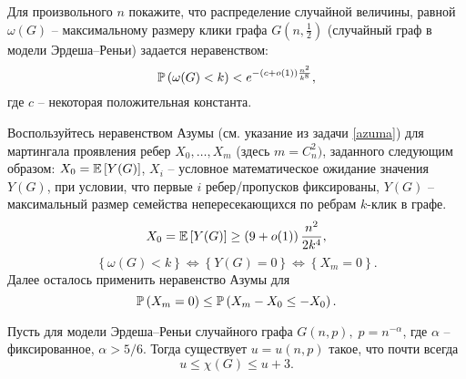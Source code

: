 \begin{problem}

Для произвольного $n$ покажите, что распределение случайной величины, равной $\omega (G)$ -- максимальному размеру клики графа $G\left( {n,\frac{1}{2}} 
\right)$ (случайный граф в модели Эрдеша--Реньи) задается неравенством:
\[
\mathrm{{\mathbb P}}\left ( {\omega (G)<k} \right) < e^{-(c+o(1))\frac{n^2}{k^8}},
\]
где $c$ -- некоторая положительная константа.

\end{problem}

\begin{ordre}
 Воспользуйтесь неравенством Азумы (см. указание из задачи \ref{azuma}) для мартингала проявления ребер $X_0 ,\ldots ,X_m $ (здесь $m=C_n^2 )$, заданного следующим образом: $X_0 = \mathrm{{\mathbb E}} \left[ {Y(G)} \right]$, $X_i $ -- условное математическое ожидание значения $Y(G)$, при 
условии, что первые $i$ ребер/пропусков фиксированы, $Y(G)$ -- максимальный размер семейства непересекающихся по ребрам $k$-клик в графе. 
\[
X_0 = \mathrm{{\mathbb E}}\left[ {Y(G)} \right]\ge \left( {9+o(1)} 
\right)\frac{n^2}{2k^4},
\]
\[
\left\{ \omega (G)<k \right\} 
\Leftrightarrow 
\left\{ Y(G)=0 \right\}
\Leftrightarrow
\left\{ X_m =0 \right\}.
\]
Далее осталось применить неравенство Азумы для 
\[
\mathrm{{\mathbb P}}\left( {X_m =0} \right)\le \mathrm{{\mathbb P}}\left( {X_m -X_0 \le -X_0 } \right).
\]

\end{ordre}

\begin{problem}
Пусть для модели Эрдеша--Реньи случайного графа $G(n,p),\; p=n^{-\alpha }$, где $\alpha $ -- фиксированное, $\alpha > 5/6$. Тогда существует $u=u(n,p)$ такое, что почти всегда 
\[
u\le \chi (G)\le u+3.
\]
\end{problem}


